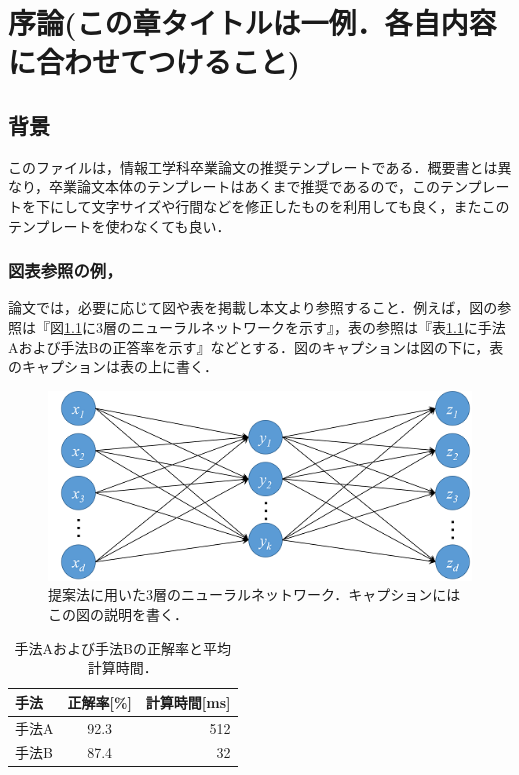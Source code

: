 \documentclass[12pt,a4j]{jreport}
\begin{document}
\chapter{序論(この章タイトルは一例．各自内容に合わせてつけること)}

\section{背景}
このファイルは，情報工学科卒業論文の推奨テンプレートである．概要書とは異なり，卒業論文本体のテンプレートはあくまで推奨であるので，このテンプレートを下にして文字サイズや行間などを修正したものを利用しても良く，またこのテンプレートを使わなくても良い．


\subsection{図表参照の例，}
論文では，必要に応じて図や表を掲載し本文より参照すること．例えば，図の参照は『図\ref{fig_nn}に3層のニューラルネットワークを示す』，表の参照は『表\ref{table_a}に手法Aおよび手法Bの正答率を示す』などとする．図のキャプションは図の下に，表のキャプションは表の上に書く．

\begin{figure}[ht]
	\centering
	\includegraphics[keepaspectratio, width=120mm]{img/sample.png}
	\caption{提案法に用いた3層のニューラルネットワーク．キャプションにはこの図の説明を書く．}
	\label{fig_nn}
\end{figure}

\begin{table}[ht]
  \caption{手法Aおよび手法Bの正解率と平均計算時間．}
  \label{table_a}
  \centering
  \begin{tabular}{lcr}
    \hline
    手法   & 正解率[\%]  &  計算時間[ms]  \\
    \hline \hline
    手法A  & 92.3  & 512 \\
    手法B  & 87.4  & 32  \\
    \hline
  \end{tabular}
\end{table}
\end{document}
